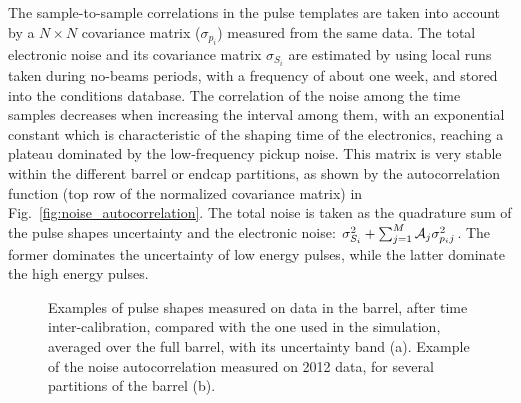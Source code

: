 \documentclass[journal]{IEEEtran}
\begin{document}
The sample-to-sample correlations in the pulse templates are taken into account by a $N \times N$ covariance matrix ($\sigma_{p_i}$) measured from the same data. The total electronic noise and its covariance matrix $\sigma_{S_i}$ are estimated by using local runs taken during no-beams periods, with a frequency of about one week, and stored into the conditions database. The correlation of the noise among the time samples decreases when increasing the interval among them, with an exponential constant which is characteristic of the shaping time of the electronics, reaching a plateau dominated by the low-frequency pickup noise. This matrix is very stable within the different barrel or endcap partitions, as shown by the autocorrelation function (top row of the normalized covariance matrix) in Fig.~\ref{fig:noise_autocorrelation}. The total noise is taken as the quadrature sum of the pulse shapes uncertainty and the electronic noise: $\sigma_{S_i}^2+\sum_{j=1}^M {\cal A}_{j}\sigma_{p_ij}^2$. The former dominates the uncertainty of low energy pulses, while the latter dominate the high energy pulses.
%
\begin{figure}[!t]
  \begin{center}
    \caption{Examples of pulse shapes measured on data in the barrel, after time inter-calibration, compared with the one used in the simulation, averaged over the full barrel, with its uncertainty band (a). Example of the noise autocorrelation measured on 2012 data, for several partitions of the barrel (b). \label{fig:pulse_shapes} }
  \end{center}
\end{figure}
\end{document}

